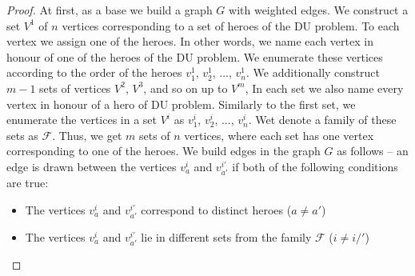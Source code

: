 \documentclass[smallextended]{svjour3}       %
\begin{document}
\begin{proof}
	At first, as a base we build a graph $G$ with weighted edges.
    We construct a set $V^1 $ of $n$ vertices corresponding to a set of heroes of the DU problem. To each vertex we assign one of the heroes. In other words, we name each vertex in honour of one of the heroes of the DU problem. We enumerate these vertices according to the order of the heroes $v_1^1$, $v_2^1$, ..., $ v_n^1$.
    We additionally construct $m-1$ sets of vertices $ V^2 $, $ V^3 $, and so on up to $ V^m $, In each set we also name every vertex in honour of a hero of  DU problem. Similarly to the first set, we enumerate the vertices in a set $V^i $ as $ v_1^i $, $v_2^i$, ..., $v_n^i$.
    Wet denote a family of these sets as $ \mathcal{F} $. Thus, we get $m$ sets of $n$ vertices, where each set has one vertex corresponding to one of the heroes.
   We build edges in the graph $G$ as follows --  an edge is drawn between the vertices $v_a^i $ and $v_{a'}^{i'} $  if both of the following conditions are true:
    \begin{itemize}
        \item The vertices $v_a^i $ and $v_{a'}^{i'} $ correspond to distinct heroes ($a \neq a'$)
        \item The vertices $v_a^i $ and $v_{a'}^{i'} $ lie in different sets from the family $\mathcal{F}$ ($ i \neq i /'$)
    \end{itemize}


\end{proof}
\end{document}
